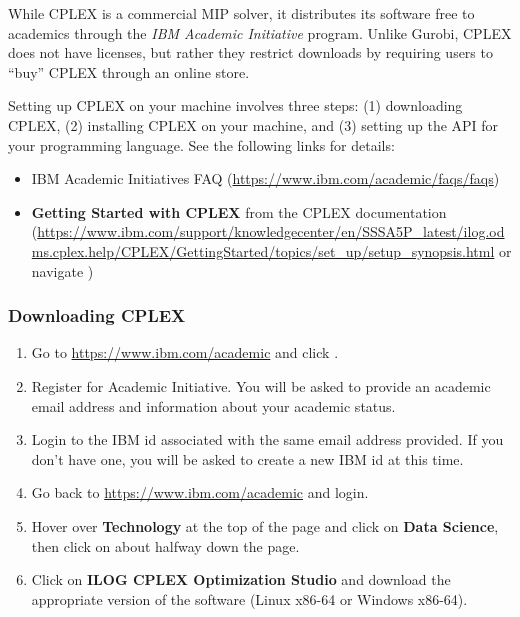\documentclass[12pt]{article}
\begin{document}
While CPLEX is a commercial MIP solver, it distributes its software free to academics through the \emph{IBM Academic Initiative} program.
Unlike Gurobi, CPLEX does not have licenses, but rather they restrict downloads by requiring users to ``buy'' CPLEX through an online store.

Setting up CPLEX on your machine involves three steps: (1) downloading CPLEX, (2) installing CPLEX on your machine, and (3) setting up the API for your programming language.
See the following links for details:
\begin{itemize}
    \item IBM Academic Initiatives FAQ (\url{https://www.ibm.com/academic/faqs/faqs})
    \item \textbf{Getting Started with CPLEX} from the CPLEX documentation (\url{https://www.ibm.com/support/knowledgecenter/en/SSSA5P_latest/ilog.odms.cplex.help/CPLEX/GettingStarted/topics/set_up/setup_synopsis.html} or navigate )
\end{itemize}
\subsubsection{Downloading CPLEX}
\begin{enumerate}
    \item Go to \url{https://www.ibm.com/academic} and click .
    \item Register for Academic Initiative.
        You will be asked to provide an academic email address and information about your academic status.
    \item Login to the IBM id associated with the same email address provided.
        If you don't have one, you will be asked to create a new IBM id at this time.
    \item Go back to \url{https://www.ibm.com/academic} and login.
    \item Hover over \textbf{Technology} at the top of the page and click on \textbf{Data Science}, then click on  about halfway down the page.
    \item Click on \textbf{ILOG CPLEX Optimization Studio} and download the appropriate version of the software (Linux x86-64 or Windows x86-64).
\end{enumerate}
\end{document}
